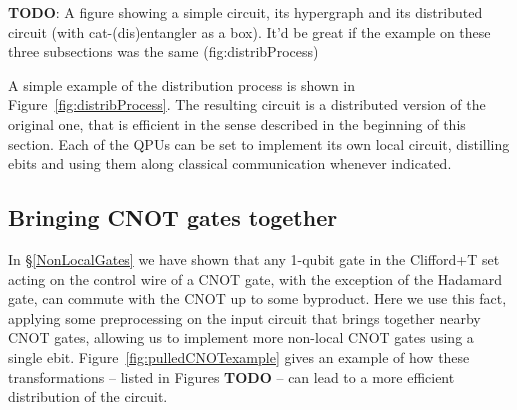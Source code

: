 \begin{comment}
\begin{algorithm}[caption={Algorithm for distributing a circuit using an assignment \(qpuOf \colon \mathbb{N} \to \mathbb{N}\) which indicates the QPU number of the given wire},label={code:distribution}]
input: circuit, $qpuOf$
output: distributed
begin
  distributed $\gets$ $emptyCircuit$
  foreach wire in circuit do
    thisQPU = $qpuOf$(wire)
    activeConnections $\gets$ $\varnothing$
    foreach gate in wire do
      if gate == CNOT and $controlOf$(gate) == wire then
        targetQPU = $qpuOf$($targetOf$(gate))
        if targetQPU == thisQPU then
          distributed.$addCNOTAt$(wire,target)
        else
          ebit $\gets$ activeConnections.$at$(targetQPU)
          if ebit == null then
            ebit $\gets$ $distillEbit$(thisQPU, targetQPU)
            distributed.$addCatEntangler$(ebit, wire)
            activeConnections.$at$(targetQPU) $\gets$ ebit
          distributed.$addCNOTAt$(ebit,$targetOf$(gate))
      else
        distributed.$addGateAt$(gate,wire)
end
\end{algorithm}
\end{comment}


\textbf{TODO}: A figure showing a simple circuit, its hypergraph and its distributed circuit (with cat-(dis)entangler as a box). It'd be great if the example on these three subsections was the same (fig:distribProcess)

A simple example of the distribution process is shown in Figure~\ref{fig:distribProcess}. The resulting circuit is a distributed version of the original one, that is efficient in the sense described in the beginning of this section. Each of the QPUs can be set to implement its own local circuit, distilling ebits and using them along classical communication whenever indicated.


\subsection{Bringing CNOT gates together}
\label{pullCNOTs}

In \S\ref{NonLocalGates} we have shown that any 1-qubit gate in the Clifford+T set acting on the control wire of a CNOT gate, with the exception of the Hadamard gate, can commute with the CNOT up to some byproduct. Here we use this fact, applying some preprocessing on the input circuit that brings together nearby CNOT gates, allowing us to implement more non-local CNOT gates using a single ebit. Figure~\ref{fig:pulledCNOTexample} gives an example of how these transformations -- listed in Figures \textbf{TODO} -- can lead to a more efficient distribution of the circuit.

